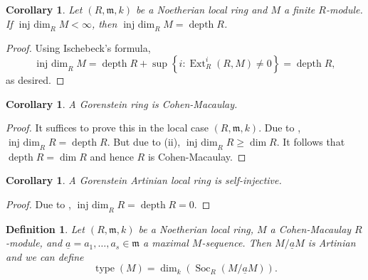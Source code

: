 \documentclass[10pt]{article}
\theoremstyle{thmstyle}
\theoremstyle{defstyle}
\newtheorem{definition}[theorem]{Definition}
\newtheorem{corollary}[theorem]{Corollary}
\newcommand{\frakm}{\mathfrak{m}} %
\renewcommand{\ge}{\geqslant}
\newcommand{\Ext}{\operatorname{Ext}}
\newcommand{\Soc}{\operatorname{Soc}}
\newcommand{\injdim}{\operatorname{inj~dim}}
\newcommand{\depth}{\operatorname{depth}}
\newcommand{\ul}[1]{\underline{#1}}
\newcommand{\type}{\operatorname{type}}
\begin{document}
\begin{corollary}
    Let $(R,\frakm,k)$ be a Noetherian local ring and $M$ a finite $R$-module. If $\injdim_R M < \infty$, then $\injdim_R M = \depth R$.
\end{corollary}
\begin{proof}
    Using Ischebeck's formula, 
    \begin{equation*}
        \injdim_R M = \depth R + \sup\left\{i\colon\Ext^i_R(R, M)\ne 0\right\} = \depth R,
    \end{equation*}
    as desired.
\end{proof}

\begin{corollary}
    A Gorenstein ring is Cohen-Macaulay.
\end{corollary}
\begin{proof}
    It suffices to prove this in the local case $(R,\frakm,k)$. Due to , $\injdim_R R = \depth R$. But due to  (ii), $\injdim_R R\ge\dim R$. It follows that $\depth R = \dim R$ and hence $R$ is Cohen-Macaulay.
\end{proof}

\begin{corollary}
    A Gorenstein Artinian local ring is self-injective.
\end{corollary}
\begin{proof}
    Due to , $\injdim_R R = \depth R = 0$.
\end{proof}

\begin{definition}
    Let $(R,\frakm,k)$ be a Noetherian local ring, $M$ a Cohen-Macaulay $R$-module, and $\ul a = a_1,\dots,a_s\in\frakm$ a maximal $M$-sequence. Then $M/\ul aM$ is Artinian and we  can define 
    \begin{equation*}
        \type(M) = \dim_k\left(\Soc_R\left(M/\ul a M\right)\right).
    \end{equation*}
\end{definition}
\end{document}

